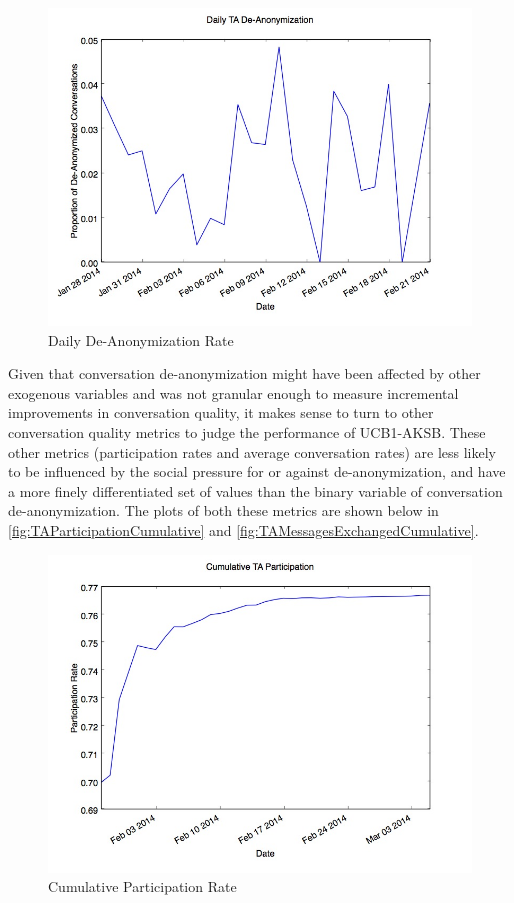 \begin{figure}[H]
\centering
\includegraphics[trim= 0mm 0mm 0mm 0mm, clip, scale=0.5]{./Figures/DailyTADe-Anonymization.jpg}
\caption{Daily De-Anonymization Rate}
\label{fig:TADe-AnonymizationDaily}
\end{figure}

Given that conversation de-anonymization might have been affected by other exogenous variables and was not granular enough to measure incremental improvements in conversation quality, it makes sense to turn to other conversation quality metrics to judge the performance of UCB1-AKSB. These other metrics (participation rates and average conversation rates) are less likely to be influenced by the social pressure for or against de-anonymization, and have a more finely differentiated set of values than the binary variable of conversation de-anonymization. The plots of both these metrics are shown below in \autoref{fig:TAParticipationCumulative} and \autoref{fig:TAMessagesExchangedCumulative}.

\begin{figure}[H]
\centering
\includegraphics[trim= 0mm 0mm 0mm 0mm, clip, scale=0.5]{./Figures/CumulativeTAParticipation.jpg}
\caption{Cumulative Participation Rate}
\label{fig:TAParticipationCumulative}
\end{figure}

